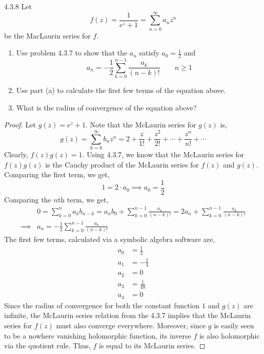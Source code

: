 \documentclass[12pt]{amsart}
\begin{document}
\begin{problem}{4.3.8}
    Let 
    \[ f(z) = \frac{1}{e^z + 1} = \sum_{n=0}^\infty a_nz^n \]
    be the MacLaurin series for $f$. 
    \begin{enumerate}
        \item Use problem 4.3.7 to show that the $a_n$ satisfy $a_0 = \frac{1}{2}$ and 
        \[ a_n = -\frac{1}{2}\sum_{k=0}^{n-1} \frac{a_k}{(n-k)!} \qquad n \geq 1 \]
        \item Use part (a) to calculate the first few terms of the equation above. 
        \item What is the radius of convergence of the equation above?
    \end{enumerate}
\end{problem}
\begin{proof}
    Let $g(z) = e^z + 1$. Note that the McLaurin series for $g(z)$ is, 
    \[ g(z) = \sum_{k=0}^\infty b_nz^n = 2 + \frac{z}{1!} + \frac{z^2}{2!} + \cdots +  \frac{z^n}{n!} + \cdots \]
    Clearly, $f(z)g(z) = 1$. Using 4.3.7, we know that the McLaurin series for $f(z)g(z)$ is the Cauchy product of the McLaurin series for $f(z)$ and $g(z)$. Comparing the first term, we get, 
    \[ 1 = 2 \cdot a_0 \implies a_0 = \frac{1}{2}\]
    Comparing the $n$th term, we get, 
    \begin{align*}
        &0 = \sum_{k=0}^n a_kb_{n-k} = a_nb_0 + \sum_{k=0}^{n-1} \frac{a_k}{(n-k)!} = 2a_n + \sum_{k=0}^{n-1} \frac{a_k}{(n-k)!}  \\
        \implies &a_n = -\frac{1}{2}\sum_{k=0}^{n-1} \frac{a_k}{(n-k)!}
    \end{align*}
    The first few terms, calculated via a symbolic algebra software are, 
    \begin{align*}
        a_0 &= \frac{1}{2} \\
        a_1 &= -\frac{1}{4} \\
        a_2 &= 0 \\
        a_3 &= \frac{1}{48} \\
        a_4 &= 0 
    \end{align*}
    Since the radius of convergence for both the constant function $1$ and $g(z)$ are infinite, the McLaurin series relation from the 4.3.7 implies that the McLaurin series for $f(z)$ must also converge everywhere. Moreover, since $g$ is easily seen to be a nowhere vanishing holomorphic function, its inverse $f$ is also holomorphic via the quotient rule. Thus, $f$ is equal to its McLaurin series. 
\end{proof}
\newpage 
\end{document}
